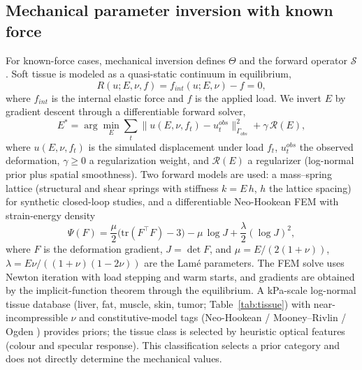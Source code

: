 \documentclass[pdflatex,lineno,referee,sn-vancouver,Numbered]{sn-jnl}
\begin{document}
\subsection{Mechanical parameter inversion with known force}
\label{sec:tier3}
For known-force cases, mechanical inversion defines $\Theta$ and the
forward operator $\mathcal{S}$. Soft tissue
is modeled as a quasi-static continuum in equilibrium,
\begin{equation}
R(u; E, \nu, f) = f_{int}(u; E, \nu) - f = 0,
\label{eq:equilibrium}
\end{equation}
where $f_{int}$ is the internal elastic force and $f$ is the applied load.
We invert $E$ by gradient descent through a differentiable forward
solver,
\begin{equation}
E^* = \arg\min_{E} \sum_{t} \big\| u(E, \nu, f_t) - u_t^{obs} \big\|_{\Gamma_{obs}}^{2} + \gamma\,\mathcal{R}(E),
\label{eq:inversion}
\end{equation}
where $u(E,\nu,f_t)$ is the simulated displacement under load $f_t$,
$u_t^{obs}$ the observed deformation, $\gamma \ge 0$ a regularization
weight, and $\mathcal{R}(E)$ a regularizer
(log-normal prior plus spatial smoothness). Two forward models are used: a
mass--spring lattice (structural and shear springs with stiffness
$k = E\,h$, $h$ the lattice spacing) for synthetic closed-loop studies, and
a differentiable Neo-Hookean FEM \cite{holzapfel2000,ogden1997,fung1993}
with strain-energy density
\begin{equation}
\Psi(F) = \frac{\mu}{2}\big(\mathrm{tr}(F^{\top}F) - 3\big) - \mu\,\log J + \frac{\lambda}{2}(\log J)^2,
\label{eq:neohookean}
\end{equation}
where $F$ is the deformation gradient, $J = \det F$, and
$\mu = E/(2(1+\nu))$, $\lambda = E\nu/((1+\nu)(1-2\nu))$ are the Lam\'e
parameters. The FEM solve uses Newton iteration with load stepping and warm
starts, and gradients are obtained by the implicit-function theorem through
the equilibrium. A kPa-scale log-normal tissue database (liver, fat,
muscle, skin, tumor; Table~\ref{tab:tissue}) with near-incompressible $\nu$
and constitutive-model tags (Neo-Hookean / Mooney--Rivlin
\cite{rivlin1948} / Ogden \cite{ogden1997}) provides priors; the tissue
class is selected by heuristic optical features (colour and specular
response). This classification selects a prior category and does not
directly determine the mechanical values.
\end{document}
